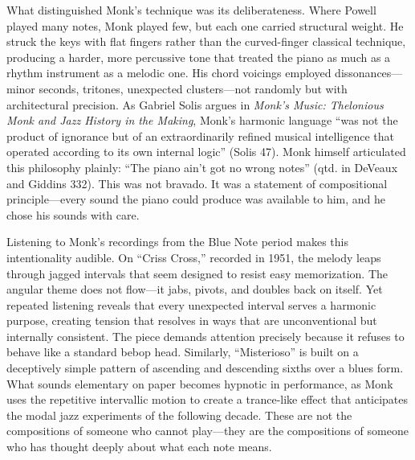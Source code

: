 \documentclass[12pt]{article}
\begin{document}
What distinguished Monk's technique was its deliberateness. Where Powell played many notes, Monk played few, but each one carried structural weight. He struck the keys with flat fingers rather than the curved-finger classical technique, producing a harder, more percussive tone that treated the piano as much as a rhythm instrument as a melodic one. His chord voicings employed dissonances---minor seconds, tritones, unexpected clusters---not randomly but with architectural precision. As Gabriel Solis argues in \textit{Monk's Music: Thelonious Monk and Jazz History in the Making}, Monk's harmonic language ``was not the product of ignorance but of an extraordinarily refined musical intelligence that operated according to its own internal logic'' (Solis 47). Monk himself articulated this philosophy plainly: ``The piano ain't got no wrong notes'' (qtd. in DeVeaux and Giddins 332). This was not bravado. It was a statement of compositional principle---every sound the piano could produce was available to him, and he chose his sounds with care.

Listening to Monk's recordings from the Blue Note period makes this intentionality audible. On ``Criss Cross,'' recorded in 1951, the melody leaps through jagged intervals that seem designed to resist easy memorization. The angular theme does not flow---it jabs, pivots, and doubles back on itself. Yet repeated listening reveals that every unexpected interval serves a harmonic purpose, creating tension that resolves in ways that are unconventional but internally consistent. The piece demands attention precisely because it refuses to behave like a standard bebop head. Similarly, ``Misterioso'' is built on a deceptively simple pattern of ascending and descending sixths over a blues form. What sounds elementary on paper becomes hypnotic in performance, as Monk uses the repetitive intervallic motion to create a trance-like effect that anticipates the modal jazz experiments of the following decade. These are not the compositions of someone who cannot play---they are the compositions of someone who has thought deeply about what each note means.
\end{document}
